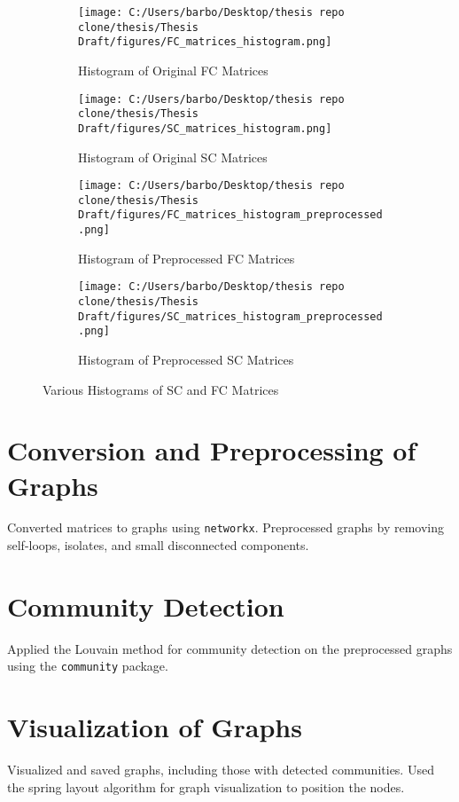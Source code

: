 \begin{figure}[h!]
    \centering
    \begin{subfigure}[b]{0.45\textwidth}
        \texttt{[image: C:/Users/barbo/Desktop/thesis repo clone/thesis/Thesis Draft/figures/FC\_matrices\_histogram.png]}
        \caption{Histogram of Original FC Matrices}
    \end{subfigure}
    \begin{subfigure}[b]{0.45\textwidth}
        \texttt{[image: C:/Users/barbo/Desktop/thesis repo clone/thesis/Thesis Draft/figures/SC\_matrices\_histogram.png]}
        \caption{Histogram of Original SC Matrices}
    \end{subfigure}
    
    \begin{subfigure}[b]{0.45\textwidth}
        \texttt{[image: C:/Users/barbo/Desktop/thesis repo clone/thesis/Thesis Draft/figures/FC\_matrices\_histogram\_preprocessed.png]}
        \caption{Histogram of Preprocessed FC Matrices}
    \end{subfigure}
    \begin{subfigure}[b]{0.45\textwidth}
        \texttt{[image: C:/Users/barbo/Desktop/thesis repo clone/thesis/Thesis Draft/figures/SC\_matrices\_histogram\_preprocessed.png]}
        \caption{Histogram of Preprocessed SC Matrices}
    \end{subfigure}
    
    \caption{Various Histograms of SC and FC Matrices}
\end{figure}


\section{Conversion and Preprocessing of Graphs}
Converted matrices to graphs using \texttt{networkx}. Preprocessed graphs by removing self-loops, isolates, and small disconnected components.

\section{Community Detection}
Applied the Louvain method for community detection on the preprocessed graphs using the \texttt{community} package.

\section{Visualization of Graphs}
Visualized and saved graphs, including those with detected communities. Used the spring layout algorithm for graph visualization to position the nodes. 


